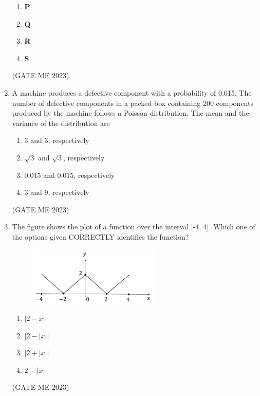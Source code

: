 \documentclass[journal]{IEEEtran}
\begin{document}
\begin{enumerate}
\begin{enumerate}
    \item \textbf{P}
    \item \textbf{Q}
    \item \textbf{R}
    \item \textbf{S}
\end{enumerate}
\hfill (GATE ME 2023)

\item A machine produces a defective component with a probability of 0.015. The number of defective components in a packed box containing 200 components produced by the machine follows a Poisson distribution. The mean and the variance of the distribution are

\begin{enumerate}
    \item 3 and 3, respectively
    \item $ \sqrt{3} $ and $ \sqrt{3} $, respectively
    \item 0.015 and 0.015, respectively
    \item 3 and 9, respectively
\end{enumerate}
\hfill (GATE ME 2023)

\item The figure shows the plot of a function over the interval [-4, 4]. Which one of the options given CORRECTLY identifies the function?
\begin{figure}[H]
\centering
\includegraphics[width=0.6\textwidth]{Fig 4.png}
\caption{}
\label{fig:question12}
\end{figure}

\begin{enumerate}
    \item $ |2 - x| $
    \item $ |2 - |x|| $
    \item $ |2 + |x|| $
    \item $ 2 - |x| $
\end{enumerate}
\hfill (GATE ME 2023)


\end{enumerate}
\end{document}
